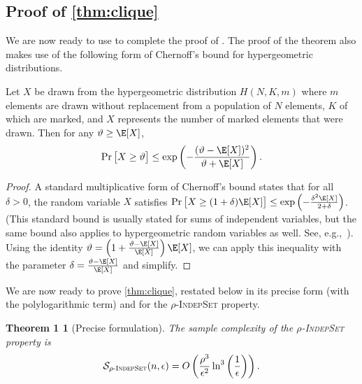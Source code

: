 \documentclass[11pt]{article}
\begin{document}
\subsection{Proof of \autoref{thm:clique}}\label{sect:proof}
We are now ready to use  to complete the proof of . The proof of the theorem also makes use of the following form of Chernoff's bound for hypergeometric distributions.

\begin{lemma}
\label{lem:chernoff}
Let $X$ be drawn from the hypergeometric distribution $H(N,K,m)$ where $m$ elements are drawn without replacement from a population of $N$ elements, $K$ of which are marked, and $X$ represents the number of marked elements that were drawn.
Then for any $\vartheta \geq \E[X]$,
\[
\Pr\big[X \geq \vartheta\big] \leq \exp\left(-\frac{(\vartheta-\E[X])^2}{\vartheta+\E[X]}\right).
\]
\end{lemma}

\begin{proof}
A standard multiplicative form of Chernoff's bound states that for all $\delta > 0$, the random variable $X$ satisfies $\Pr\big[X \geq (1+\delta)\E[X]\big] \leq \exp\left(-\frac{\delta^2\E[X]}{2+\delta}\right)$. (This standard bound is usually stated for sums of independent variables, but the same bound also applies to hypergeometric random variables as well. See, e.g.,~\cite{Mulzer2018}). Using the identity $\vartheta=\left(1+\frac{\vartheta-\E[X]}{\E[X]}\right)\E[X]$, we can apply this inequality with the parameter $\delta=\frac{\vartheta-\E[X]}{\E[X]}$ and simplify.
\end{proof}

We are now ready to prove \autoref{thm:clique}, restated below in its precise form (with the polylogarithmic term) and for the \textsc{$\rho$-IndepSet} property. 

\newtheorem*{clique-thm-precise}{Theorem 1}
\begin{clique-thm-precise}[Precise formulation]
The sample complexity of the \textsc{$\rho$-IndepSet} property is 
\[
\mathcal{S}_{\rho\textsc{-IndepSet}}(n,\epsilon) = O\left(\frac{\rho^3}{\epsilon^2} \ln^3\left(\frac 1\epsilon \right)\right).
\]
\end{clique-thm-precise}
\end{document}
